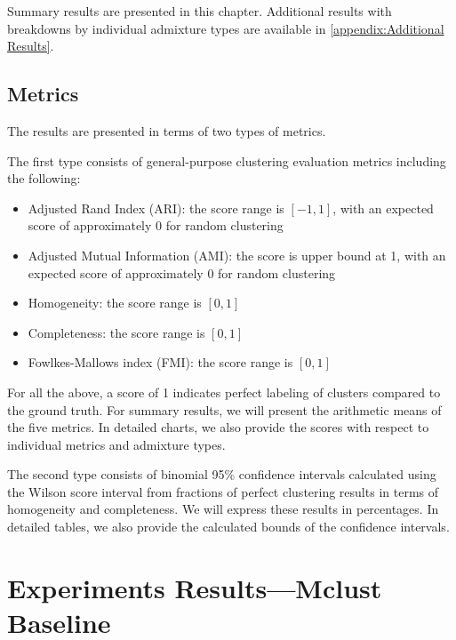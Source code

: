 Summary results are presented in this chapter. Additional results with breakdowns by individual admixture types are available in \cref{appendix:Additional Results}.

\FloatBarrier
\subsection{Metrics}

The results are presented in terms of two types of metrics.

The first type consists of general-purpose clustering evaluation metrics including the following:

\begin{itemize}
  \item Adjusted Rand Index (ARI): the score range is $[-1, 1]$, with an expected score of approximately 0 for random clustering
  \item Adjusted Mutual Information (AMI): the score is upper bound at 1, with an expected score of approximately 0 for random clustering
  \item Homogeneity: the score range is $[0, 1]$
  \item Completeness: the score range is $[0, 1]$
  \item Fowlkes-Mallows index (FMI): the score range is $[0, 1]$
\end{itemize}

For all the above, a score of 1 indicates perfect labeling of clusters compared to the ground truth. For summary results, we will present the arithmetic means of the five metrics. In detailed charts, we also provide the scores with respect to individual metrics and admixture types.

The second type consists of binomial 95\% confidence intervals calculated using the Wilson score interval from fractions of perfect clustering results in terms of homogeneity and completeness. We will express these results in percentages. In detailed tables, we also provide the calculated bounds of the confidence intervals.

\section{Experiments Results---Mclust Baseline}

